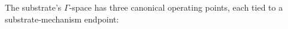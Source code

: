 The substrate's $\Gamma$-space has three canonical operating points, each tied to a substrate-mechanism endpoint:

